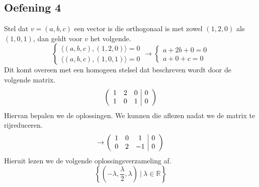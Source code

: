 \documentclass[lineaire_algebra_oplossingen.tex]{subfiles}
\begin{document}
\subsection{Oefening 4}
Stel dat $v=(a,b,c)$ een vector is die orthogonaal is met zowel $(1,2,0)$ als $(1,0,1)$, dan geldt voor $v$ het volgende.
\[
\left\{
\begin{array}{c}
\langle (a,b,c) , (1,2,0) \rangle = 0\\
\langle (a,b,c) , (1,0,1) \rangle = 0
\end{array}
\right.
\longrightarrow
\left\{
\begin{array}{c}
a + 2b + 0 = 0\\
a + 0 + c = 0
\end{array}
\right.
\]
Dit komt overeen met een homogeen stelsel dat beschreven wordt door de volgende matrix.
\[
\left(
\begin{array}{c c c | c}
1 & 2 & 0 & 0\\
1 & 0 & 1 & 0
\end{array}
\right)
\]
Hiervan bepalen we de oplossingen. We kunnen die aflezen nadat we de matrix te rijreduceren.
\[
\rightarrow
\left(
\begin{array}{c c c | c}
1 & 0 & 1 & 0\\
0 & 2 & -1 & 0
\end{array}
\right)
\]
Hieruit lezen we de volgende oplossingsverzameling af.
\[
\left\{
(-\lambda,\frac{\lambda}{2},\lambda)\ |\ \lambda\in\mathbb{R}
\right\}
\]
\end{document}

